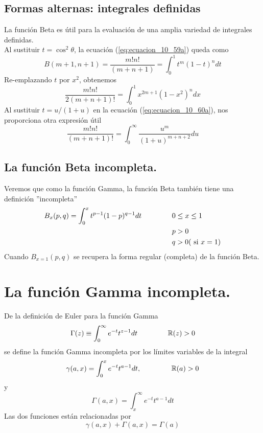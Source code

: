 \subsection{Formas alternas: integrales definidas}
La función Beta es útil para la evaluación de una amplia variedad de integrales definidas.\\
Al sustituir $t= \cos^{2} \theta$, la ecuación (\ref{eq:ecuacion_10_59a}) queda como
\begin{equation}
B(m+1,n+1) = \dfrac{m! n!}{(m+n+1)} = \int_{0}^{1} t^{m} (1-t)^{n} dt
\label{eq:ecuacion_10_60a}
\end{equation}
Re-emplazando $t$ por $x^{2}$, obtenemos
\begin{equation}
\dfrac{m! n!}{2(m+n+1)!} = \int_{0}^{1} x^{2m+1} (1-x^{2})^{n} dx
\label{eq:ecuacion_10_60a}
\end{equation}
Al sustituir $t= u/(1+u)$ en la ecuación (\ref{eq:ecuacion_10_60a}), nos proporciona otra expresión útil
\begin{equation}
\dfrac{m! n!}{(m+n+1)!} = \int_{0}^{\infty} \dfrac{u^{m}}{(1+u)^{m+n+2}} du
\label{eq:ecuacion_10_61}
\end{equation}
\subsection{La función Beta incompleta.}
Veremos que como la función Gamma, la función Beta también tiene una definición ''incompleta''
\begin{eqnarray}
\begin{aligned}
B_{x}(p,q) = \int_{0}^{x} t^{p-1} (1-p)^{q-1} dt \hspace{1.5cm} & 0 \leq x \leq 1 \\
& p > 0 \\
& q > 0 (\text{ si } x=1)
\label{eq:ecuacion_10_67}
\end{aligned}
\end{eqnarray}
Cuando $B_{x=1}(p,q)$ se recupera la forma regular (completa) de la función Beta.
\section{La función Gamma incompleta.}
De la definición de Euler para la función Gamma 
\[  \Gamma(z) \equiv \int_{0}^{\infty} e^{-t} t^{z-1} dt \hspace{1.5cm} \mathbb{R}(z) > 0 \]
se define la función Gamma incompleta por los límites variables de la integral
\[ \gamma(a,x) = \int_{0}^{x} e^{-t} t^{a-1} dt, \hspace{1.5cm} \mathbb{R} (a) > 0 \]
y
\begin{equation}
\Gamma(a,x) = \int_{x}^{\infty} e^{-t} t^{a-1} dt 
\label{eq:ecuacion_10_68}
\end{equation}
Las dos funciones están relacionadas por
\begin{equation}
\gamma(a,x) + \Gamma(a,x) = \Gamma(a)
\end{equation}
